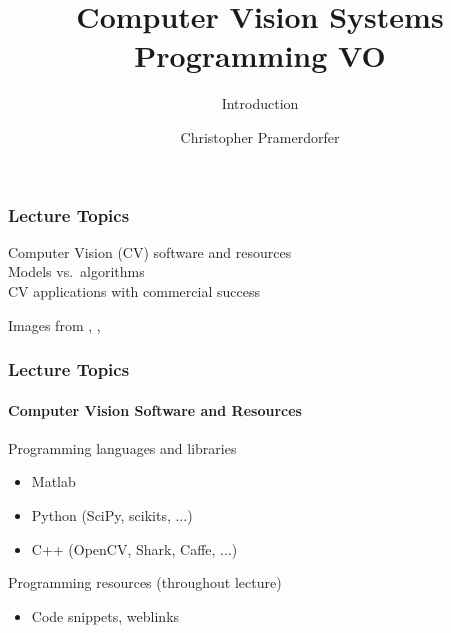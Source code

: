 \documentclass[xetex,professionalfont]{beamer}
\title{Computer Vision Systems Programming VO}
\subtitle{Introduction}
\author{Christopher Pramerdorfer}
\institute{Computer Vision Lab, Vienna University of Technology}
\begin{document}

\begin{frame}
\maketitle
\end{frame}


\begin{frame}
\frametitle{Lecture Topics}

Computer Vision (CV) software and resources\\\medskip
Models vs.\ algorithms\\\medskip
CV applications with commercial success

\bigskip
\begin{center}
	{\centering Images from \cite{lecun1989}, \cite{shotton2011}, \cite{taigman2013}}
\end{center}

\end{frame}


\begin{frame}
\frametitle{Lecture Topics}
\framesubtitle{Computer Vision Software and Resources}

Programming languages and libraries
\begin{itemize}
	\item Matlab
	\item Python (SciPy, scikits, ...)
	\item C++ (OpenCV, Shark, Caffe, ...)
\end{itemize}

\bigskip
Programming resources (throughout lecture)
\begin{itemize}
	\item Code snippets, weblinks
\end{itemize}

\end{frame}
\end{document}
